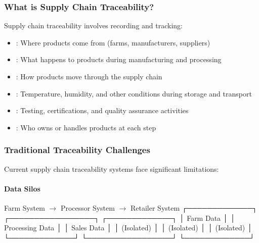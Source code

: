 \documentclass[letterpaper,10pt,english]{sphinxmanual}
\begin{document}
\subsubsection{What is Supply Chain Traceability?}
\label{\detokenize{foundational/intro-to-supply-chain-traceability:what-is-supply-chain-traceability}}
\sphinxAtStartPar
Supply chain traceability involves recording and tracking:
\begin{itemize}
\item {} 
\sphinxAtStartPar
{}: Where products come from (farms, manufacturers, suppliers)

\item {} 
\sphinxAtStartPar
{}: What happens to products during manufacturing and processing

\item {} 
\sphinxAtStartPar
{}: How products move through the supply chain

\item {} 
\sphinxAtStartPar
{}: Temperature, humidity, and other conditions during storage and transport

\item {} 
\sphinxAtStartPar
{}: Testing, certifications, and quality assurance activities

\item {} 
\sphinxAtStartPar
{}: Who owns or handles products at each step

\end{itemize}


\subsubsection{Traditional Traceability Challenges}
\label{\detokenize{foundational/intro-to-supply-chain-traceability:traditional-traceability-challenges}}
\sphinxAtStartPar
Current supply chain traceability systems face significant limitations:


\paragraph{Data Silos}
\label{\detokenize{foundational/intro-to-supply-chain-traceability:data-silos}}
\begin{sphinxVerbatim}[commandchars=\\\{\}]
Farm System     \(\rightarrow\)    Processor System    \(\rightarrow\)    Retailer System
┌─────────────┐      ┌─────────────────┐      ┌─────────────┐
│ Farm Data   │      │ Processing Data │      │ Sales Data  │
│ (Isolated)  │      │ (Isolated)      │      │ (Isolated)  │
└─────────────┘      └─────────────────┘      └─────────────┘
\end{sphinxVerbatim}
\end{document}
